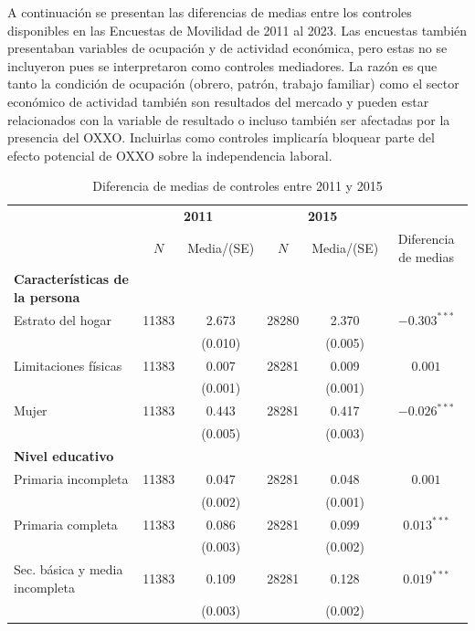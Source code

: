 \documentclass{article}
\begin{document}
A continuación se presentan las diferencias de medias entre los controles disponibles en las Encuestas de Movilidad de 2011 al 2023. Las encuestas también presentaban variables de ocupación y de actividad económica, pero estas no se incluyeron pues se interpretaron como controles mediadores. La razón es que tanto la condición de ocupación (obrero, patrón, trabajo familiar) como el sector económico de actividad también son resultados del mercado y pueden estar relacionados con la variable de resultado o incluso también ser afectadas por la presencia del OXXO. Incluirlas como controles implicaría bloquear parte del efecto potencial de OXXO sobre la independencia laboral. \\

\begin{table}[H]
 \centering
  \caption{Diferencia de medias de controles entre 2011 y 2015}
  \label{tab:balance_2011_2015}
  \begin{tabular}{l c c c c c}
    \toprule
    & \multicolumn{2}{c}{\textbf{2011}} & \multicolumn{2}{c}{\textbf{2015}} & \\
    \cmidrule(lr){2-3} \cmidrule(lr){4-5}
    & $N$ & Media/(SE) & $N$ & Media/(SE) & Diferencia de medias \\
    \midrule
    \textbf{Características de la persona} & & & & & \\
    Estrato del hogar & 11383 & 2.673 & 28280 & 2.370 & $-0.303^{***}$ \\
     & & (0.010) & & (0.005) & \\
    Limitaciones físicas & 11383 & 0.007 & 28281 & 0.009 & $0.001$ \\
     & & (0.001) & & (0.001) & \\
    Mujer & 11383 & 0.443 & 28281 & 0.417 & $-0.026^{***}$ \\
     & & (0.005) & & (0.003) & \\
    \midrule
    \textbf{Nivel educativo} & & & & & \\
    Primaria incompleta & 11383 & 0.047 & 28281 & 0.048 & $0.001$ \\
     & & (0.002) & & (0.001) & \\
    Primaria completa & 11383 & 0.086 & 28281 & 0.099 & $0.013^{***}$ \\
     & & (0.003) & & (0.002) & \\
    Sec. básica y media incompleta & 11383 & 0.109 & 28281 & 0.128 & $0.019^{***}$ \\
     & & (0.003) & & (0.002) & \\

\end{tabular}
\end{table}
\end{document}
